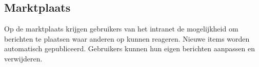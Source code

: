 \subsection{Marktplaats}\label{marktplaats}

Op de marktplaats krijgen gebruikers van het intranet de mogelijkheid om berichten te plaatsen waar anderen op kunnen reageren. Nieuwe items worden automatisch gepubliceerd. Gebruikers kunnen hun eigen berichten aanpassen en verwijderen.
